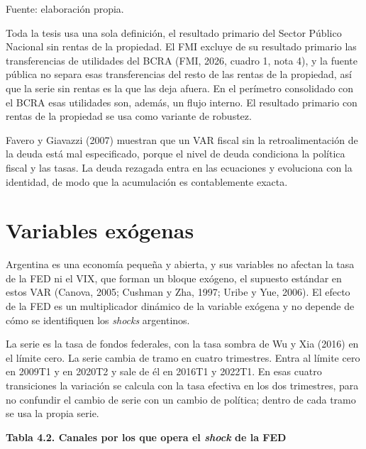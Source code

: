 Fuente: elaboración propia.

Toda la tesis usa una sola definición, el resultado primario del Sector
Público Nacional sin rentas de la propiedad. El FMI excluye de su
resultado primario las transferencias de utilidades del BCRA (FMI, 2026,
cuadro 1, nota 4), y la fuente pública no separa esas transferencias del
resto de las rentas de la propiedad, así que la serie sin rentas es la
que las deja afuera. En el perímetro consolidado con el BCRA esas
utilidades son, además, un flujo interno. El resultado primario con
rentas de la propiedad se usa como variante de robustez.

Favero y Giavazzi (2007) muestran que un VAR fiscal sin la
retroalimentación de la deuda está mal especificado, porque el nivel de
deuda condiciona la política fiscal y las tasas. La deuda rezagada entra
en las ecuaciones y evoluciona con la identidad, de modo que la
acumulación es contablemente exacta.

\section{Variables exógenas}

Argentina es una economía pequeña y abierta, y sus variables no afectan
la tasa de la FED ni el VIX, que forman un bloque exógeno, el supuesto
estándar en estos VAR (Canova, 2005; Cushman y Zha, 1997; Uribe y Yue,
2006). El efecto de la FED es un multiplicador dinámico de la variable
exógena y no depende de cómo se identifiquen los \emph{shocks}
argentinos.

La serie es la tasa de fondos federales, con la tasa sombra de Wu y Xia
(2016) en el límite cero. La serie cambia de tramo en cuatro trimestres.
Entra al límite cero en 2009T1 y en 2020T2 y sale de él en 2016T1 y
2022T1. En esas cuatro transiciones la variación se calcula con la tasa
efectiva en los dos trimestres, para no confundir el cambio de serie con
un cambio de política; dentro de cada tramo se usa la propia serie.

\textbf{Tabla 4.2. Canales por los que opera el \emph{shock} de la FED}

